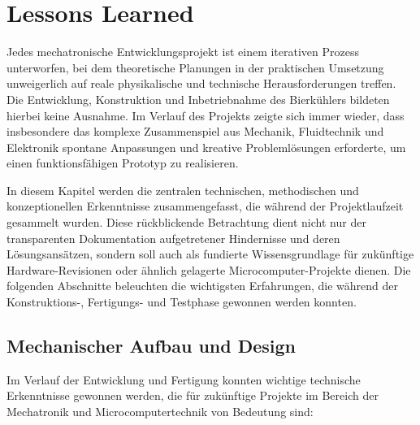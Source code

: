 \chapter{Lessons Learned}

Jedes mechatronische Entwicklungsprojekt ist einem iterativen Prozess unterworfen, bei dem theoretische Planungen in der praktischen Umsetzung unweigerlich auf reale physikalische und technische Herausforderungen treffen. Die Entwicklung, Konstruktion und Inbetriebnahme des Bierkühlers bildeten hierbei keine Ausnahme. Im Verlauf des Projekts zeigte sich immer wieder, dass insbesondere das komplexe Zusammenspiel aus Mechanik, Fluidtechnik und Elektronik spontane Anpassungen und kreative Problemlösungen erforderte, um einen funktionsfähigen Prototyp zu realisieren.

In diesem Kapitel werden die zentralen technischen, methodischen und konzeptionellen Erkenntnisse zusammengefasst, die während der Projektlaufzeit gesammelt wurden. Diese rückblickende Betrachtung dient nicht nur der transparenten Dokumentation aufgetretener Hindernisse und deren Lösungsansätzen, sondern soll auch als fundierte Wissensgrundlage für zukünftige Hardware-Revisionen oder ähnlich gelagerte Microcomputer-Projekte dienen. Die folgenden Abschnitte beleuchten die wichtigsten Erfahrungen, die während der Konstruktions-, Fertigungs- und Testphase gewonnen werden konnten.

\section{Mechanischer Aufbau und Design}

Im Verlauf der Entwicklung und Fertigung konnten wichtige technische Erkenntnisse gewonnen werden, die für zukünftige Projekte im Bereich der Mechatronik und Microcomputertechnik von Bedeutung sind:

